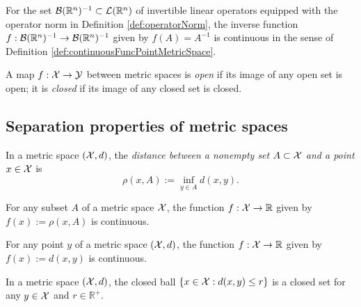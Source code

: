 \begin{lem}
  \label{lem:funcInverseIsContinuous}
  For the set ${\cal B}(\mathbb{R}^n)^{-1}\subset
  {\cal L}(\mathbb{R}^n)$
  of invertible linear operators equipped
  with the operator norm in Definition \ref{def:operatorNorm},
  the inverse function 
  $f: {\cal B}(\mathbb{R}^n)^{-1}\rightarrow
  {\cal B}(\mathbb{R}^n)^{-1}$ 
  given by $f(A) = A^{-1}$ is continuous
  in the sense of Definition \ref{def:continuousFuncPointMetricSpace}.
\end{lem}




\begin{defn}
  \label{def:openMap}
  A map $f:{\cal X}\rightarrow {\cal Y}$ between metric spaces is \emph{open}
  if its image of any open set is open; 
  it is \emph{closed} if its image of any closed set is closed. 
\end{defn}



\subsection{Separation properties of metric spaces}
\label{sec:separ-prop}


\begin{defn}
  \label{def:distPointAndSet}
  In a metric space $({\cal X},d)$, 
  the \emph{distance between a nonempty set $A\subset {\cal X}$
    and a point $x\in {\cal X}$}
  is
  \begin{equation}
    \label{eq:distPointAndSet}
    \rho(x,A) := \inf_{y\in A} d(x,y).
  \end{equation}
\end{defn}

\begin{lem}
  \label{lem:distPointAndSetContinuous}
  For any subset $A$ of a metric space ${\cal X}$,
  the function $f: {\cal X}\rightarrow \mathbb{R}$
  given by $f(x):= \rho(x,A)$ is continuous.
\end{lem}

\begin{coro}
  \label{coro:metricContinuous}
  For any point $y$ of a metric space $({\cal X},d)$,
  the function $f: {\cal X}\rightarrow \mathbb{R}$
  given by $f(x):= d(x,y)$ is continuous.
\end{coro}

\begin{coro}
  \label{coro:closedBallIsClosed}
  In a metric space $({\cal X},d)$,
  the closed ball $\{x\in{\cal X}: d(x,y)\le r\}$
  is a closed set for any $y\in {\cal X}$ and $r\in\mathbb{R}^+$.
\end{coro}


